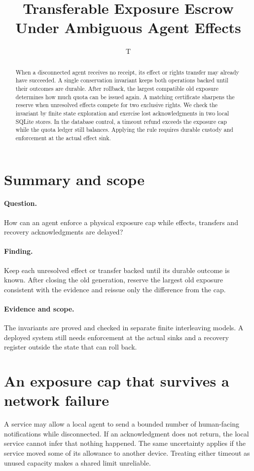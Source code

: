 \documentclass[11pt]{article}
\title{Transferable Exposure Escrow Under Ambiguous Agent Effects}
\author{T}
\date{}
\begin{document}
\maketitle
\begin{abstract}
When a disconnected agent receives no receipt, its effect or rights
transfer may already have succeeded. A single conservation invariant
keeps both operations backed until their outcomes are durable.
After rollback, the largest compatible old exposure determines how
much quota can be issued again. A matching certificate sharpens the
reserve when unresolved effects compete for two exclusive rights.
We check the invariant by finite state exploration and exercise
lost acknowledgments in two local SQLite stores. In the database
control, a timeout refund exceeds the exposure cap while the quota
ledger still balances. Applying the rule requires durable custody
and enforcement at the actual effect sink.
\end{abstract}

\section*{Summary and scope}
\paragraph{Question.} How can an agent enforce a physical exposure
cap while effects, transfers and recovery acknowledgments are delayed?
\paragraph{Finding.} Keep each unresolved effect or transfer backed
until its durable outcome is known. After closing the old generation,
reserve the largest old exposure consistent with the evidence and
reissue only the difference from the cap.
\paragraph{Evidence and scope.} The invariants are proved
and checked in separate finite interleaving models. A deployed
system still needs enforcement at the actual sinks and a recovery
register outside the state that can roll back.

\section{An exposure cap that survives a network failure}
A service may allow a local agent to send a bounded number of
human-facing notifications while disconnected. If an acknowledgment
does not return, the local service cannot infer that nothing happened.
The same uncertainty applies if the service moved some of its
allowance to another device. Treating either timeout as unused
capacity makes a shared limit unreliable.
\end{document}
